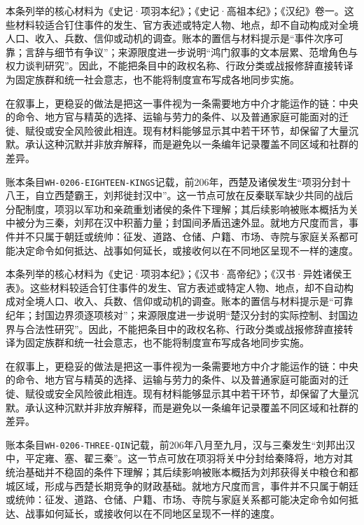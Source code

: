 本条列举的核心材料为《史记·项羽本纪》；《史记·高祖本纪》；《汉纪》卷一。这些材料较适合钉住事件的发生、官方表述或特定人物、地点，却不自动构成对全境人口、收入、兵数、信仰或动机的调查。账本的置信与材料提示是“事件次序可靠；言辞与细节有争议”；来源限度进一步说明“鸿门叙事的文本层累、范增角色与权力谈判研究”。因此，不能把条目中的政权名称、行政分类或战报修辞直接转译为固定族群和统一社会意志，也不能将制度宣布写成各地同步实施。

在叙事上，更稳妥的做法是把这一事件视为一条需要地方中介才能运作的链：中央的命令、地方官与精英的选择、运输与劳力的条件、以及普通家庭可能面对的迁徙、赋役或安全风险彼此相连。现有材料能够显示其中若干环节，却保留了大量沉默。承认这种沉默并非放弃解释，而是避免以一条编年记录覆盖不同区域和社群的差异。

账本条目\texttt{WH-0206-EIGHTEEN-KINGS}记载，前206年，西楚及诸侯发生“项羽分封十八王，自立西楚霸王，刘邦徙封汉中”。这一节点可放在反秦联军缺少共同的战后分配制度，项羽以军功和亲疏重划诸侯的条件下理解；其后续影响被账本概括为关中被分为三秦，刘邦在汉中积蓄力量；封国间矛盾迅速外显。就地方尺度而言，事件并不只属于朝廷或统帅：征发、道路、仓储、户籍、市场、寺院与家庭关系都可能决定命令如何抵达、战事如何延长，或接收何以在不同地区呈现不一样的速度。

本条列举的核心材料为《史记·项羽本纪》；《汉书·高帝纪》；《汉书·异姓诸侯王表》。这些材料较适合钉住事件的发生、官方表述或特定人物、地点，却不自动构成对全境人口、收入、兵数、信仰或动机的调查。账本的置信与材料提示是“可靠纪年；封国边界须逐项核对”；来源限度进一步说明“楚汉分封的实际控制、封国边界与合法性研究”。因此，不能把条目中的政权名称、行政分类或战报修辞直接转译为固定族群和统一社会意志，也不能将制度宣布写成各地同步实施。

在叙事上，更稳妥的做法是把这一事件视为一条需要地方中介才能运作的链：中央的命令、地方官与精英的选择、运输与劳力的条件、以及普通家庭可能面对的迁徙、赋役或安全风险彼此相连。现有材料能够显示其中若干环节，却保留了大量沉默。承认这种沉默并非放弃解释，而是避免以一条编年记录覆盖不同区域和社群的差异。

账本条目\texttt{WH-0206-THREE-QIN}记载，前206年八月至九月，汉与三秦发生“刘邦出汉中，平定雍、塞、翟三秦”。这一节点可放在项羽将关中分封给秦降将，地方对其统治基础并不稳固的条件下理解；其后续影响被账本概括为刘邦获得关中粮仓和都城区域，形成与西楚长期竞争的财政基础。就地方尺度而言，事件并不只属于朝廷或统帅：征发、道路、仓储、户籍、市场、寺院与家庭关系都可能决定命令如何抵达、战事如何延长，或接收何以在不同地区呈现不一样的速度。

